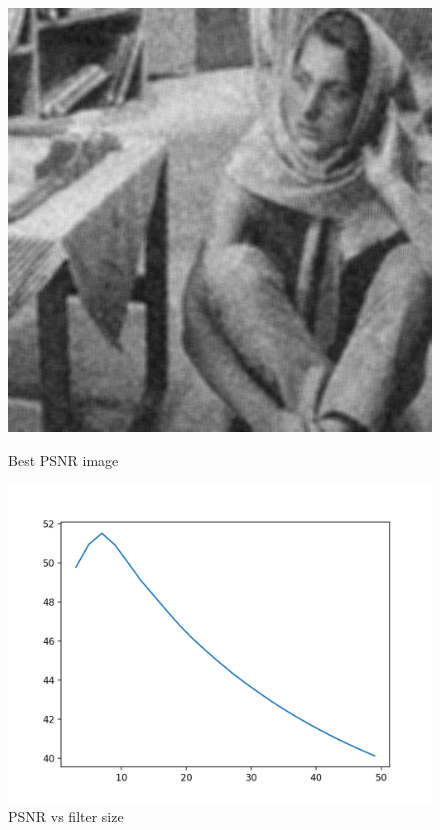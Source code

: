 \documentclass{article}
\begin{document}
    \begin{figure}[!htb]
      \includegraphics[scale=0.3]{./basic_denoising/barbara/average_best_gaussian.png}
      \caption{Best PSNR image}
    \endminipage \hfill
      \includegraphics[scale=.45]{./basic_denoising/barbara/average_psnr_gaussian.png}
      \caption{PSNR vs filter size}
    \endminipage
    \end{figure}
    
\end{document}
